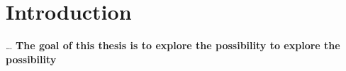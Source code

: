 \chapter*{Introduction}



\ldots
\textbf{The goal of this thesis is to explore the possibility to explore the possibility}